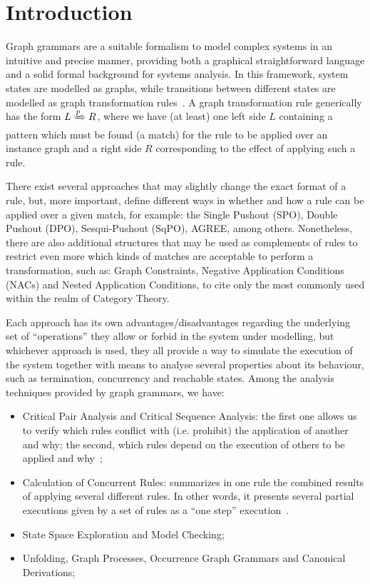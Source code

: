 \chapter{Introduction}

Graph grammars are a suitable formalism to model complex systems in an intuitive and precise manner, providing both a graphical straightforward language and a solid formal background for systems analysis. In this framework, system states are modelled as graphs, while transitions between different states are modelled as graph transformation rules~\cite{Ehrig2006}. A graph transformation rule generically has the form $L \xRightarrow{p} R$, where we have (at least) one left side $L$ containing a pattern which must be found (a match) for the rule to be applied over an instance graph and a right side $R$ corresponding to the effect of applying such a rule.

There exist several approaches that may slightly change the exact format of a rule, but, more important, define different ways in whether and how a rule can be applied over a given match, for example: the Single Pushout (SPO), Double Pushout (DPO), Sesqui-Pushout (SqPO), AGREE, among others. Nonetheless, there are also additional structures that may be used as complements of rules to restrict even more which kinds of matches are acceptable to perform a transformation, such as: Graph Constraints, Negative Application Conditions (NACs) and Nested Application Conditions, to cite only the most commonly used within the realm of Category Theory.

Each approach has its own advantages/disadvantages regarding the underlying set of ``operations'' they allow or forbid in the system under modelling, but whichever approach is used, they all provide a way to simulate the execution of the system together with means to analyse several properties about its behaviour, such as termination, concurrency and reachable states. Among the analysis techniques provided by graph grammars, we have:

\begin{itemize}
  \item Critical Pair Analysis and Critical Sequence Analysis: the first one allows us to verify which rules conflict with (i.e. prohibit) the application of another and why; the second, which rules depend on the execution of others to be applied and why~\cite{Lambers2008a};
  \item Calculation of Concurrent Rules: summarizes in one rule the combined results of applying several different rules. In other words, it presents several partial executions given by a set of rules as a ``one step'' execution~\cite{Lambers2008,BezerraETMF2016}.
  \item State Space Exploration and Model Checking; ~\cite{Rensink2004}
  \item Unfolding, Graph Processes, Occurrence Graph Grammars and Canonical Derivations; ~\cite{Corradini1996,Ribeiro1996}
\end{itemize}

